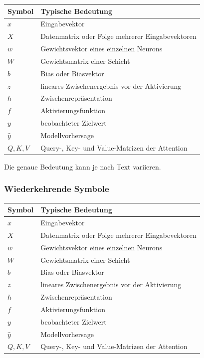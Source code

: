 \par\addvspace{\medskipamount}
\noindent\begin{tabularx}{\linewidth}{@{}>{\raggedright\arraybackslash}p{}>{\raggedright\arraybackslash}X@{}}
\toprule
Symbol & Typische Bedeutung \\
\midrule
$x$ & Eingabevektor \\
$X$ & Datenmatrix oder Folge mehrerer Eingabevektoren \\
$w$ & Gewichtsvektor eines einzelnen Neurons \\
$W$ & Gewichtsmatrix einer Schicht \\
$b$ & Bias oder Biasvektor \\
$z$ & lineares Zwischenergebnis vor der Aktivierung \\
$h$ & Zwischenrepräsentation \\
$f$ & Aktivierungsfunktion \\
$y$ & beobachteter Zielwert \\
$\hat{y}$ & Modellvorhersage \\
$Q,K,V$ & Query-, Key- und Value-Matrizen der Attention \\
\bottomrule
\end{tabularx}
\par\addvspace{\medskipamount}

Die genaue Bedeutung kann je nach Text variieren.
\subsubsection{Wiederkehrende Symbole}

\par\addvspace{\medskipamount}
\noindent\begin{tabularx}{\linewidth}{@{}>{\raggedright\arraybackslash}p{}>{\raggedright\arraybackslash}X@{}}
\toprule
Symbol & Typische Bedeutung \\
\midrule
$x$ & Eingabevektor \\
$X$ & Datenmatrix oder Folge mehrerer Eingabevektoren \\
$w$ & Gewichtsvektor eines einzelnen Neurons \\
$W$ & Gewichtsmatrix einer Schicht \\
$b$ & Bias oder Biasvektor \\
$z$ & lineares Zwischenergebnis vor der Aktivierung \\
$h$ & Zwischenrepräsentation \\
$f$ & Aktivierungsfunktion \\
$y$ & beobachteter Zielwert \\
$\hat{y}$ & Modellvorhersage \\
$Q,K,V$ & Query-, Key- und Value-Matrizen der Attention \\
\bottomrule
\end{tabularx}
\par\addvspace{\medskipamount}


